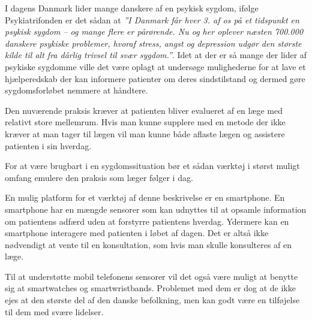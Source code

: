 


I dagens Danmark lider mange danskere af en psykisk sygdom, ifølge Psykiatrifonden er det sådan at \textit{''I Danmark får hver 3. af os på et tidspunkt en psykisk sygdom – og mange flere er pårørende. 
Nu og her oplever næsten 700.000 danskere psykiske problemer, hvoraf stress, angst og depression udgør den største kilde til alt fra dårlig trivsel til svær sygdom.''}\cite{psykiatrifonden}.
Idet at der er så mange der lider af psykiske sygdomme ville det være oplagt at undersøge mulighederne for at lave et hjælperedskab der kan informere patienter om deres sindstilstand og dermed gøre sygdomsforløbet nemmere at håndtere.

Den nuværende praksis kræver at patienten bliver evalueret af en læge med relativt store mellemrum.
Hvis man kunne supplere med en metode der ikke kræver at man tager til lægen vil man kunne både aflaste lægen og assistere patienten i sin hverdag.

For at være brugbart i en sygdomssituation bør et sådan værktøj i størst muligt omfang emulere den praksis som læger følger i dag.

En mulig platform for et værktøj af denne beskrivelse er en smartphone.
En smartphone har en mængde sensorer som kan udnyttes til at opsamle information om patientens adfærd uden at forstyrre patientens hverdag.
Ydermere kan en smartphone interagere med patienten i løbet af dagen. 
Det er altså ikke nødvendigt at vente til en konsultation, som hvis man skulle konsulteres af en læge.

Til at understøtte mobil telefonens sensorer vil det også være muligt at benytte sig at smartwatches og smartwristbands.
Problemet med dem er dog at de ikke ejes at den største del af den danske befolkning, men kan godt være en tilføjelse til dem med svære lidelser.

